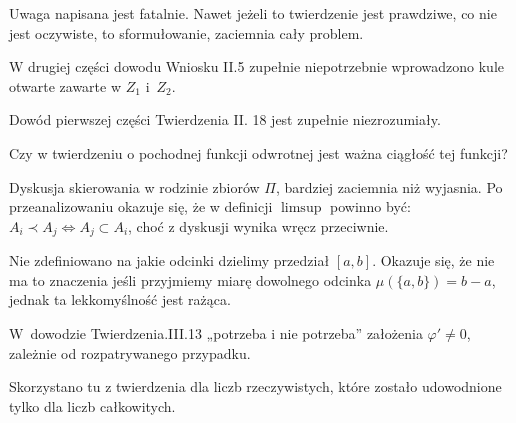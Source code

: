\documentclass[a4paper,11pt]{article}
\begin{document}
\start {} Uwaga napisana jest fatalnie. Nawet jeżeli to
twierdzenie jest prawdziwe, co nie jest oczywiste, to sformułowanie,
zaciemnia cały problem.

\vspace{\spaceFour}



\start {} W drugiej części dowodu Wniosku II.5 zupełnie
niepotrzebnie wprowadzono kule otwarte zawarte w $Z_{ 1 }$ i~$Z_{ 2 }$.

\vspace{\spaceFour}



\start {} Dowód pierwszej części Twierdzenia II. 18 jest
zupełnie niezrozumiały.

\vspace{\spaceFour}



\start {} Czy w twierdzeniu o pochodnej funkcji odwrotnej jest
ważna ciągłość tej funkcji?

\vspace{\spaceFour}



\start {} Dyskusja skierowania w rodzinie zbiorów $\Pi$,
bardziej zaciemnia niż wyjasnia. Po przeanalizowaniu okazuje się, że w
definicji $\limsup$ powinno być: \\
$A_{ i } \prec A_{ j }\Leftrightarrow A_{ j } \subset A_{ i }$, choć z
dyskusji wynika wręcz przeciwnie.

\vspace{\spaceFour}



\start {} Nie zdefiniowano na jakie odcinki dzielimy przedział
$[ a, b ]$. Okazuje się, że nie ma to znaczenia jeśli przyjmiemy miarę
dowolnego odcinka $\mu ( \{ a, b \} ) = b - a$, jednak ta
lekkomyślność jest rażąca.

\vspace{\spaceFour}



\start {} W~dowodzie Twierdzenia.III.13 „potrzeba i nie
potrzeba” założenia $\varphi' \neq 0$, zależnie od rozpatrywanego
przypadku.

\vspace{\spaceFour}



\start {} Skorzystano tu z twierdzenia dla liczb rzeczywistych,
które zostało udowodnione tylko dla liczb całkowitych.
\end{document}
